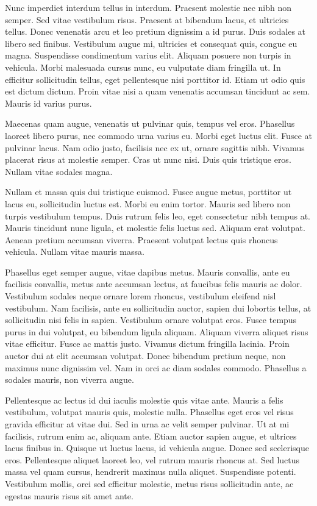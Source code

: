Nunc imperdiet interdum tellus in interdum. Praesent molestie nec nibh non semper. Sed vitae vestibulum risus. Praesent at bibendum lacus, et ultricies tellus. Donec venenatis arcu et leo pretium dignissim a id purus. Duis sodales at libero sed finibus. Vestibulum augue mi, ultricies et consequat quis, congue eu magna. Suspendisse condimentum varius elit. Aliquam posuere non turpis in vehicula. Morbi malesuada cursus nunc, eu vulputate diam fringilla ut. In efficitur sollicitudin tellus, eget pellentesque nisi porttitor id. Etiam ut odio quis est dictum dictum. Proin vitae nisi a quam venenatis accumsan tincidunt ac sem. Mauris id varius purus.

Maecenas quam augue, venenatis ut pulvinar quis, tempus vel eros. Phasellus laoreet libero purus, nec commodo urna varius eu. Morbi eget luctus elit. Fusce at pulvinar lacus. Nam odio justo, facilisis nec ex ut, ornare sagittis nibh. Vivamus placerat risus at molestie semper. Cras ut nunc nisi. Duis quis tristique eros. Nullam vitae sodales magna.

Nullam et massa quis dui tristique euismod. Fusce augue metus, porttitor ut lacus eu, sollicitudin luctus est. Morbi eu enim tortor. Mauris sed libero non turpis vestibulum tempus. Duis rutrum felis leo, eget consectetur nibh tempus at. Mauris tincidunt nunc ligula, et molestie felis luctus sed. Aliquam erat volutpat. Aenean pretium accumsan viverra. Praesent volutpat lectus quis rhoncus vehicula. Nullam vitae mauris massa.

Phasellus eget semper augue, vitae dapibus metus. Mauris convallis, ante eu facilisis convallis, metus ante accumsan lectus, at faucibus felis mauris ac dolor. Vestibulum sodales neque ornare lorem rhoncus, vestibulum eleifend nisl vestibulum. Nam facilisis, ante eu sollicitudin auctor, sapien dui lobortis tellus, at sollicitudin nisi felis in sapien. Vestibulum ornare volutpat eros. Fusce tempus purus in dui volutpat, eu bibendum ligula aliquam. Aliquam viverra aliquet risus vitae efficitur. Fusce ac mattis justo. Vivamus dictum fringilla lacinia. Proin auctor dui at elit accumsan volutpat. Donec bibendum pretium neque, non maximus nunc dignissim vel. Nam in orci ac diam sodales commodo. Phasellus a sodales mauris, non viverra augue.

Pellentesque ac lectus id dui iaculis molestie quis vitae ante. Mauris a felis vestibulum, volutpat mauris quis, molestie nulla. Phasellus eget eros vel risus gravida efficitur at vitae dui. Sed in urna ac velit semper pulvinar. Ut at mi facilisis, rutrum enim ac, aliquam ante. Etiam auctor sapien augue, et ultrices lacus finibus in. Quisque ut luctus lacus, id vehicula augue. Donec sed scelerisque eros. Pellentesque aliquet laoreet leo, vel rutrum mauris rhoncus at. Sed luctus massa vel quam cursus, hendrerit maximus nulla aliquet. Suspendisse potenti. Vestibulum mollis, orci sed efficitur molestie, metus risus sollicitudin ante, ac egestas mauris risus sit amet ante.


